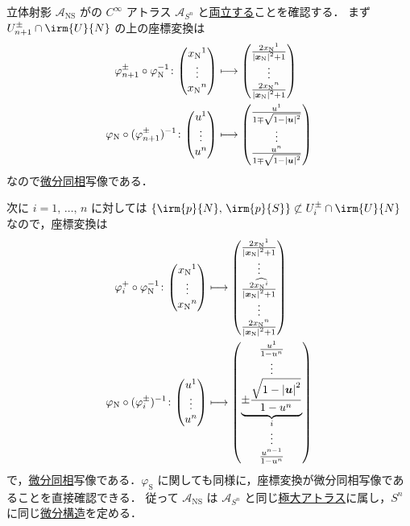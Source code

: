 \documentclass[geometry_main]{subfiles}
\begin{document}
\begin{myexample}[label=ex:stereographic-projection]{立体射影}
	$\mathcal{A}_{\mathrm{NS}}$ がの $C^\infty$ アトラス $\mathcal{A}_{S^n}$ と\hyperref[manieq]{両立する}ことを確認する．
	まず $U_{n+1}^{\pm} \cap \irm{U}{N}$ の上の座標変換は
	\begin{align}
		\varphi_{n+1}^{\pm} \circ \varphi_{\mathrm{N}}^{-1} \colon \mqty(x_{\mathrm{N}}{}^1 \\ \vdots \\ x_{\mathrm{N}}{}^n) &\lmto \mqty(\frac{2 x_{\mathrm{N}}{}^1}{\abs{\vb*{x}_{\mathrm{N}}}^2 +1} \\ \vdots \\ \frac{2 x_{\mathrm{N}}{}^n}{\abs{\vb*{x}_{\mathrm{N}}}^2 +1}) \\
		\varphi_{\mathrm{N}} \circ (\varphi_{n+1}^{\pm})^{-1} \colon \mqty(u^1 \\ \vdots \\ u^n) &\lmto \mqty(\frac{u^1}{1\mp\sqrt{1-\abs{\bm{u}}^2}} \\ \vdots \\ \frac{u^n}{1\mp\sqrt{1-\abs{\bm{u}}^2}})
	\end{align}
	なので\hyperref[def.diffeomo]{微分同相}写像である．
	
	次に $i = 1,\, \dots,\, n$ に対しては $\{\irm{p}{N},\, \irm{p}{S}\} \not\subset U_i^{\pm} \cap \irm{U}{N}$ なので，座標変換は
	\begin{align}
		\varphi_{i}^+ \circ \varphi_{\mathrm{N}}^{-1} \colon \mqty(x_{\mathrm{N}}{}^1 \\ \vdots \\ x_{\mathrm{N}}{}^n) &\lmto \mqty(\frac{2 x_{\mathrm{N}}{}^1}{\abs{\vb*{x}_{\mathrm{N}}}^2 +1} \\ \vdots \\ \frac{2 \widehat{x_{\mathrm{N}}{}^i}}{\abs{\vb*{x}_{\mathrm{N}}}^2 +1} \\ \vdots \\ \frac{2 x_{\mathrm{N}}{}^n}{\abs{\vb*{x}_{\mathrm{N}}}^2 +1}) \\
		\varphi_{\mathrm{N}} \circ (\varphi_{i}^{\pm})^{-1} \colon \mqty(u^1 \\ \vdots \\ u^n) &\lmto \mqty(\frac{u^1}{1-u^n} \\ \vdots \\ \underbrace{\pm\frac{\sqrt{1-\abs{\bm{u}}^2}}{1-u^n}}_i \\ \vdots \\ \frac{u^{n-1}}{1-u^n})
	\end{align}
	で，\hyperref[def.diffeomo]{微分同相}写像である．$\varphi_{\mathrm{S}}$ に関しても同様に，座標変換が微分同相写像であることを直接確認できる．
	従って $\mathcal{A}_{\mathrm{NS}}$ は $\mathcal{A}_{S^n}$ と同じ\hyperref[maxatlas]{極大アトラス}に属し，$S^n$ に同じ\hyperref[maxatlas]{微分構造}を定める．
\end{myexample}
\end{document}
